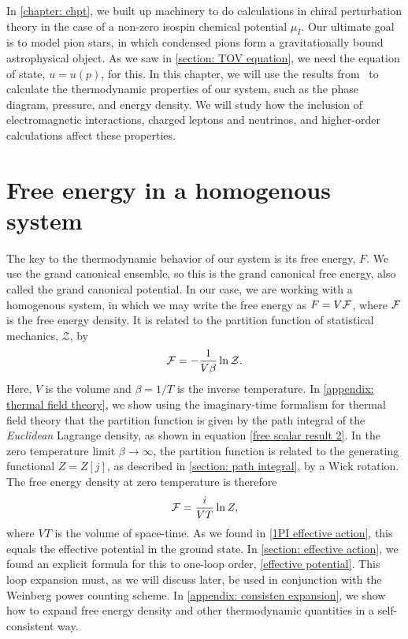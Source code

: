 In \autoref{chapter: chpt}, we built up machinery to do calculations in chiral perturbation theory in the case of a non-zero isospin chemical potential $\mu_I$.
Our ultimate goal is to model pion stars, in which condensed pions form a gravitationally bound astrophysical object.
As we saw in \autoref{section: TOV equation}, we need the equation of state, $u = u(p)$, for this.
In this chapter, we will use the results from \chpt\ to calculate the thermodynamic properties of our system, such as the phase diagram, pressure, and energy density.
We will study how the inclusion of electromagnetic interactions, charged leptons and neutrinos, and higher-order calculations affect these properties.




\section{Free energy in a homogenous system}

The key to the thermodynamic behavior of our system is its free energy, $F$.
We use the grand canonical ensemble, so this is the grand canonical free energy, also called the grand canonical potential.
In our case, we are working with a homogenous system, in which we may write the free energy as $F = V\mathcal{F}$, where $\mathcal{F}$ is the free energy density.
It is related to the partition function of statistical mechanics, $\mathcal{Z}$, by
%
\begin{equation}
    \mathcal{F} = - \frac{1}{V \beta} \ln \mathcal{Z}.
\end{equation}
%
Here, $V$ is the volume and $\beta = 1/T$ is the inverse temperature.
In \autoref{appendix: thermal field theory}, we show using the imaginary-time formalism for thermal field theory that the partition function is given by the path integral of the \emph{Euclidean} Lagrange density, as shown in equation \autoref{free scalar result 2}. 
In the zero temperature limit  $\beta \rightarrow \infty$, the partition function is related to the generating functional $Z = Z[j]$, as described in \autoref{section: path integral}, by a Wick rotation.
The free energy density at zero temperature is therefore
%
\begin{equation}
    \mathcal{F} = \frac{i}{VT} \ln Z,
\end{equation}
%
where $VT$ is the volume of space-time.
As we found in \autoref{1PI effective action}, this equals the effective potential in the ground state.
In \autoref{section: effective action}, we found an explicit formula for this to one-loop order, \autoref{effective potential}.
This loop expansion must, as we will discuss later, be used in conjunction with the Weinberg power counting scheme. 
In \autoref{appendix: consisten expansion}, we show how to expand free energy density and other thermodynamic quantities in a self-consistent way.

